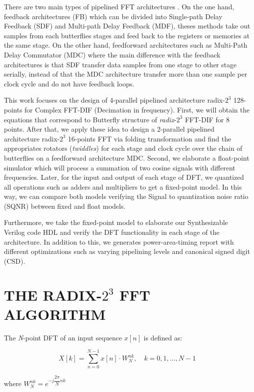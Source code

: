 \documentclass[journal,comsoc]{IEEEtran}
\begin{document}
There are two main types of pipelined FFT architectures \cite{shousheng_he_designing_1998}. On the one hand, feedback architectures (FB) which can be divided into Single-path Delay Feedback (SDF) and Multi-path Delay Feedback (MDF), theses methods take out samples from each butterflies stages and feed back to the registers or memories at the same stage. On the other hand, feedforward architectures such as Multi-Path Delay Commutator (MDC) where the main difference with the feedback architectures is that SDF transfer data samples from one stage to other stage serially, instead of that the MDC architecture transfer more than one sample per clock cycle and do not have feedback loops.

This work focuses on the design of 4-parallel pipelined architecture radix-$2^3$ 128-points for Complex FFT-DIF (Decimation in frequency). First, we will obtain the equations that correspond to Butterfly structure of \textit{radix}-$2^3$ FFT-DIF for 8 points. After that, we apply these idea to design a 2-parallel pipelined architecture radix-$2^3$ 16-points FFT via folding transformation and find the appropriates rotators (\textit{twiddles}) for each stage and clock cycle over the chain of butterflies on a feedforward architecture MDC. Second, we elaborate a float-point simulator which will process a summation of two cosine signals with different frequencies. Later, for the input and output of each stage of DFT, we quantized all operations such as adders and multipliers to get a fixed-point model. In this way, we can compare both models verifying the Signal to quantization noise ratio (SQNR) between fixed and float models.

Furthermore, we take the fixed-point model to elaborate our Synthesizable Verilog code HDL and verify the DFT functionality in each stage of the architecture. In addition to this, we generates power-area-timing report with different optimizations such as varying pipelining levels and canonical signed digit (CSD).
\section{THE RADIX-$2^3$ FFT ALGORITHM}
The \textit{N}-point DFT of an input sequence $x[n]$ is defined as:

\begin{equation}
	X[k] = \sum_{n=0}^{N-1} x[n] \cdot W_N^{nk}, \quad k=0,1,...,N-1
\end{equation}

where $W_N^{nk} = e^{-j\dfrac{2\pi}{N} nk}$ 
\end{document}
